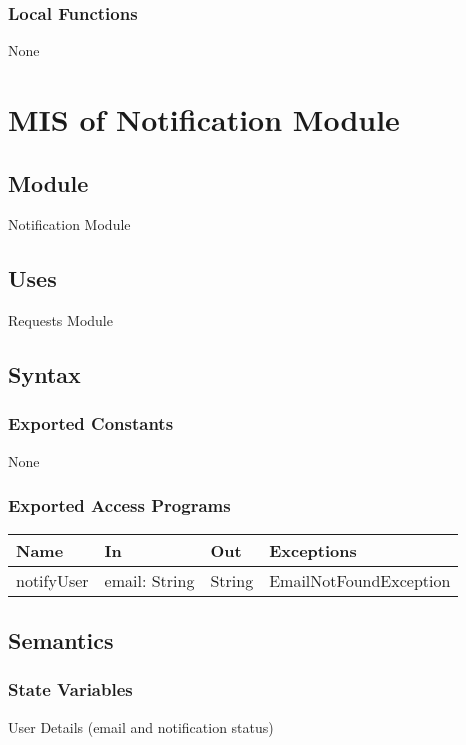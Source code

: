 \documentclass[12pt, titlepage]{article}
\begin{document}
\subsubsection{Local Functions}
None
\section{MIS of Notification Module} \label{NotificationModule}

\subsection{Module}
Notification Module

\subsection{Uses}
Requests Module

\subsection{Syntax}

\subsubsection{Exported Constants}
None

\subsubsection{Exported Access Programs}

\begin{center}
\begin{tabular}{p{2cm} p{4cm} p{2cm} p{4cm}}
\hline
\textbf{Name} & \textbf{In} & \textbf{Out} & \textbf{Exceptions} \\
\hline
notifyUser & email: String & String & EmailNotFoundException \\
\hline
\end{tabular}
\end{center}

\subsection{Semantics}

\subsubsection{State Variables}
User Details (email and notification status)
\end{document}
